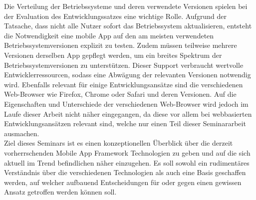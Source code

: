 Die Verteilung der Betriebssysteme und deren verwendete Versionen spielen bei der Evaluation des Entwicklungssatzes eine wichtige Rolle. Aufgrund der Tatsache, dass nicht alle Nutzer sofort das Betriebssystem aktualisieren, entsteht die Notwendigkeit eine mobile App auf den am meisten verwendeten Betriebssystemversionen explizit zu testen. Zudem müssen teilweise mehrere Versionen derselben App gepflegt werden, um ein breites Spektrum der Betriebssystemversionen zu unterstützen. Dieser Support verbraucht wertvolle Entwicklerressourcen, sodass eine Abwägung der relevanten Versionen notwendig wird\cite{flutter_support}. Ebenfalls relevant für einige Entwicklungsansätze sind die verschiedenen Web-Browser wie Firefox, Chrome oder Safari und deren Versionen. Auf die Eigenschaften und Unterschiede der verschiedenen Web-Browser wird jedoch im Laufe dieser Arbeit nicht näher eingegangen, da diese vor allem bei webbasierten Entwicklungsansätzen relevant sind, welche nur einen Teil dieser Seminararbeit ausmachen.\\

Ziel dieses Seminars ist es einen konzeptionellen Überblick über die derzeit vorherrschenden Mobile App Framework Technologien zu geben und auf die sich aktuell im Trend befindlichen näher einzugehen.
Es soll sowohl ein rudimentäres Verständnis über die verschiedenen Technologien als auch eine Basis geschaffen werden, auf welcher aufbauend Entscheidungen für oder gegen einen gewissen Ansatz getroffen werden können soll.\\

